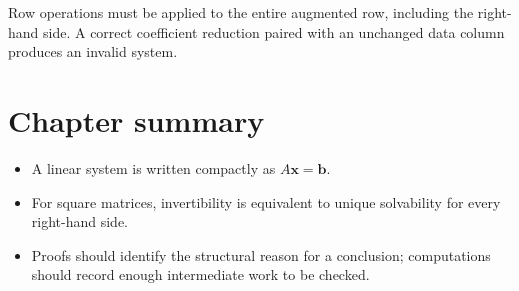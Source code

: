 \begin{commonerror}
\CheckTag\quad Row operations must be applied to the entire augmented row, including
the right-hand side. A correct coefficient reduction paired with an unchanged data
column produces an invalid system.
\end{commonerror}

\section{Chapter summary}

\begin{itemize}
  \item A linear system is written compactly as $A\bm{x}=\bm{b}$.
  \item For square matrices, invertibility is equivalent to unique solvability for every
        right-hand side.
  \item Proofs should identify the structural reason for a conclusion; computations
        should record enough intermediate work to be checked.
\end{itemize}
